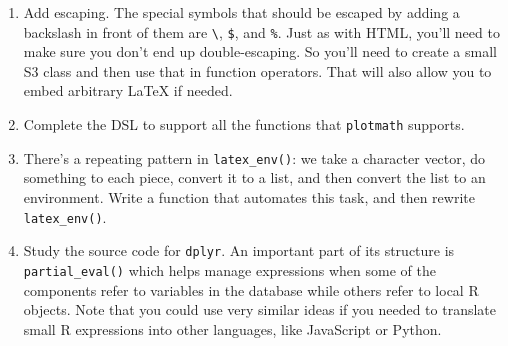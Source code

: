\begin{enumerate}
\def\labelenumi{\arabic{enumi}.}
\item
  Add escaping. The special symbols that should be escaped by adding a
  backslash in front of them are \texttt{\textbackslash{}}, \texttt{\$},
  and \texttt{\%}. Just as with HTML, you'll need to make sure you don't
  end up double-escaping. So you'll need to create a small S3 class and
  then use that in function operators. That will also allow you to embed
  arbitrary LaTeX if needed.
\item
  Complete the DSL to support all the functions that \texttt{plotmath}
  supports.
\item
  There's a repeating pattern in \texttt{latex\_env()}: we take a
  character vector, do something to each piece, convert it to a list,
  and then convert the list to an environment. Write a function that
  automates this task, and then rewrite \texttt{latex\_env()}.
\item
  Study the source code for \texttt{dplyr}. An important part of its
  structure is \texttt{partial\_eval()} which helps manage expressions
  when some of the components refer to variables in the database while
  others refer to local R objects. Note that you could use very similar
  ideas if you needed to translate small R expressions into other
  languages, like JavaScript or Python.
\end{enumerate}
